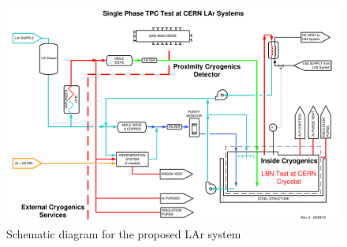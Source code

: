 \begin{figure}
\begin{center}
\includegraphics[width=.75\textwidth]{figures/proposed-LAr-system} 
\caption[Schematic diagram for the proposed LAr system]{\label{fig:proposed-LAr-system} Schematic diagram for the proposed LAr system}
\end{center}
\end{figure}


